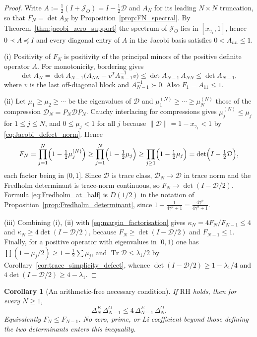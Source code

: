 \documentclass[11pt]{amsart}
\numberwithin{equation}{section}
\theoremstyle{plain}
\newtheorem{corollary}[theorem]{Corollary}
\theoremstyle{definition}
\theoremstyle{remark}
\newcommand{\RH}{\mathrm{RH}}
\newcommand{\Tr}{\operatorname{Tr}}
\begin{document}
\begin{proof}
Write $A:=\tfrac12(I+\mathcal J_O)=I-\tfrac12\mathcal D$ and $A_N$ for its leading $N\times N$
truncation, so that $F_N=\det A_N$ by Proposition~\ref{prop:FN_spectral}.  By
Theorem~\ref{thm:jacobi_zero_support} the spectrum of $\mathcal J_O$ lies in
$[x_{\gamma_1},1]$, hence $0\prec A\preceq I$ and every diagonal entry of $A$ in the
Jacobi basis satisfies $0<A_{nn}\le1$.

(i) Positivity of $F_N$ is positivity of the principal minors of the positive definite
operator $A$.  For monotonicity, bordering gives
\begin{equation}
 \det A_N=\det A_{N-1}\bigl(A_{NN}-v^TA_{N-1}^{-1}v\bigr)\le \det A_{N-1}\,A_{NN}
 \le\det A_{N-1},
\end{equation}
where $v$ is the last off-diagonal block and $A_{N-1}^{-1}\succ0$.  Also $F_1=A_{11}\le1$.

(ii) Let $\mu_1\ge\mu_2\ge\cdots$ be the eigenvalues of $\mathcal D$ and
$\mu_1^{(N)}\ge\cdots\ge\mu_N^{(N)}$ those of the compression
$\mathcal D_N=P_N\mathcal D P_N$.  Cauchy interlacing for compressions gives
$\mu_j^{(N)}\le\mu_j$ for $1\le j\le N$, and $0\le\mu_j<1$ for all $j$ because
$\|\mathcal D\|=1-x_{\gamma_1}<1$ by \eqref{eq:Jacobi_defect_norm}.  Hence
\begin{equation}
 F_N=\prod_{j=1}^{N}\Bigl(1-\tfrac12\mu_j^{(N)}\Bigr)
 \ge\prod_{j=1}^{N}\Bigl(1-\tfrac12\mu_j\Bigr)
 \ge\prod_{j\ge1}\Bigl(1-\tfrac12\mu_j\Bigr)
 =\det\Bigl(I-\tfrac12\mathcal D\Bigr),
\end{equation}
each factor being in $(0,1]$.  Since $\mathcal D$ is trace class, $\mathcal D_N\to\mathcal D$ in trace
norm and the Fredholm determinant is trace-norm continuous, so $F_N\to\det(I-\mathcal D/2)$.
Formula \eqref{eq:Fredholm_at_half} is $D(1/2)$ in the notation of
Proposition~\ref{prop:Fredholm_determinant}, since
$1-\tfrac{1}{4\gamma^2+1}=\tfrac{4\gamma^2}{4\gamma^2+1}$.

(iii) Combining (i), (ii) with \eqref{eq:margin_factorisation} gives
$\kappa_N=4F_N/F_{N-1}\le4$ and $\kappa_N\ge4\det(I-\mathcal D/2)$, because
$F_N\ge\det(I-\mathcal D/2)$ and $F_{N-1}\le1$.  Finally, for a positive operator with
eigenvalues in $[0,1)$ one has $\prod(1-\mu_j/2)\ge1-\tfrac12\sum\mu_j$, and
$\Tr\mathcal D\le\lambda_1/2$ by Corollary~\ref{cor:trace_simplicity_defect}, whence
$\det(I-\mathcal D/2)\ge1-\lambda_1/4$ and $4\det(I-\mathcal D/2)\ge4-\lambda_1$.
\end{proof}

\begin{corollary}[An arithmetic-free necessary condition]
\label{cor:kappa_le_4}
If $\RH$ holds, then for every $N\ge1$,
\[
\Delta_N^E\,\Delta_{N-1}^O
\le4\,\Delta_{N-1}^E\,\Delta_N^O.
\]
Equivalently $F_N\le F_{N-1}$.  No zero, prime, or Li coefficient beyond those defining the two
determinants enters this inequality.
\end{corollary}
\end{document}
